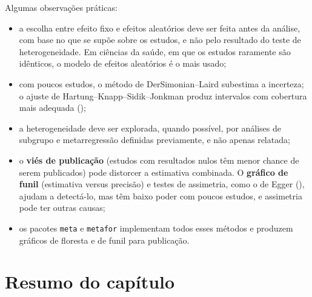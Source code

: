 \documentclass[
]{book}
\providecommand{\tightlist}{%
  \setlength{\itemsep}{0pt}\setlength{\parskip}{0pt}}
\begin{document}
Algumas observações práticas:

\begin{itemize}
\tightlist
\item
  a escolha entre efeito fixo e efeitos aleatórios deve ser feita antes da análise, com base no que se supõe sobre os estudos, e não pelo resultado do teste de heterogeneidade. Em ciências da saúde, em que os estudos raramente são idênticos, o modelo de efeitos aleatórios é o mais usado;
\item
  com poucos estudos, o método de DerSimonian--Laird subestima a incerteza; o ajuste de Hartung--Knapp--Sidik--Jonkman produz intervalos com cobertura mais adequada ();
\item
  a heterogeneidade deve ser explorada, quando possível, por análises de subgrupo e metarregressão definidas previamente, e não apenas relatada;
\item
  o \textbf{viés de publicação} (estudos com resultados nulos têm menor chance de serem publicados) pode distorcer a estimativa combinada. O \textbf{gráfico de funil} (estimativa versus precisão) e testes de assimetria, como o de Egger (), ajudam a detectá-lo, mas têm baixo poder com poucos estudos, e assimetria pode ter outras causas;
\item
  os pacotes \texttt{meta} e \texttt{metafor} implementam todos esses métodos e produzem gráficos de floresta e de funil para publicação.
\end{itemize}

\section{Resumo do capítulo}\label{resumo-do-capuxedtulo-9}
\end{document}
